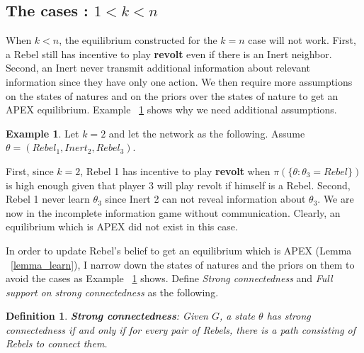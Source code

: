 \documentclass[12pt,letter]{article}
\newtheorem{definition}{Definition}[section]
\theoremstyle{definition}
\newtheorem{example}{Example}[section]
\theoremstyle{remark}
\theoremstyle{claim}
\begin{document}
\subsection{The cases : $1<k<n$}

When $k<n$, the equilibrium constructed for the $k=n$ case will not work. First, a Rebel still has incentive to play \textbf{revolt} even if there is an Inert neighbor. Second, an Inert never transmit additional information about relevant information since they have only one action. We then require more assumptions on the states of natures and on the priors over the states of nature to get an APEX equilibrium. Example ~\ref{ex_strong_connectedness} shows why we need additional assumptions.

\begin{example}\label{ex_strong_connectedness}
Let $k=2$ and let the network as the following. Assume $\theta=(Rebel_1,Inert_2,Rebel_3)$.

\begin{center}
\end{center}

First, since $k=2$, Rebel 1 has incentive to play \textbf{revolt} when $\pi(\{\theta:\theta_3=Rebel\})$ is high enough given that player 3 will play revolt if himself is a Rebel. Second, Rebel 1 never learn $\theta_3$ since Inert 2 can not reveal information about $\theta_3$. We are now in the incomplete information game without communication. Clearly, an equilibrium which is APEX did not exist in this case.

\end{example}

In order to update Rebel's belief to get an equilibrium which is APEX (Lemma ~\ref{lemma_learn}), I narrow down the states of natures and the priors on them to avoid the cases as Example ~\ref{ex_strong_connectedness} shows. Define \textit{Strong connectedness} and \textit{Full support on strong connectedness} as the following.

\begin{definition}
\textbf{Strong connectedness}: Given $G$, a state $\theta$ has strong connectedness if and only if for every pair of Rebels, there is a path consisting of Rebels to connect them.
\end{definition}  
\end{document}
